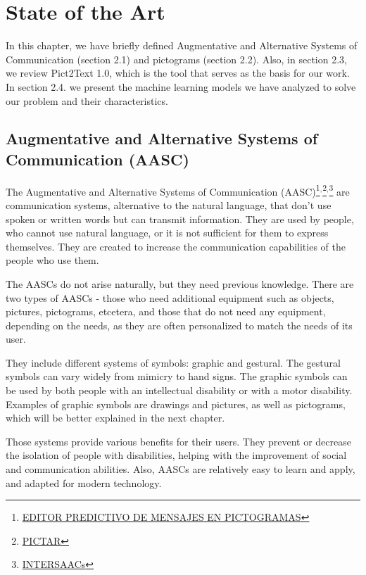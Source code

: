 
\chapter{State of the Art}
\label{State of the Art}

In this chapter, we have briefly defined Augmentative and Alternative Systems of Communication (section 2.1) and pictograms (section 2.2). Also, in section 2.3, we review Pict2Text 1.0, which is the tool that serves as the basis for our work.
In section 2.4. we present the machine learning models we have analyzed to solve our problem and their characteristics.


\section{Augmentative and Alternative Systems of Communication (AASC)}
The Augmentative and Alternative Systems of Communication (AASC)\footnote{\href{https://eprints.ucm.es/30164/1/Editor\%20predictivo\%20de\%20mensajes\%20en\%20pictogramas.pdf}{EDITOR PREDICTIVO DE MENSAJES EN PICTOGRAMAS}}$^{,}$\footnote{\href{https://eprints.ucm.es/48796/1/PICTAR.pdf}{PICTAR}}$^{,}$\footnote{\href{https://eprints.ucm.es/29245/1/ProyectoM\%C3\%A1ster_EspecialidadSistemasInteligentes_INTERSAACs_EvaGil.pdf}{INTERSAACs}} are communication systems, alternative to the natural language, that don't use spoken or written words but can transmit information. They are used by people, who cannot use natural language, or it is not sufficient for them to express themselves. They are created to increase the communication capabilities of the people who use them.

The AASCs do not arise naturally, but they need previous knowledge. There are two types of AASCs - those who need additional equipment such as objects, pictures, pictograms, etcetera, and those that do not need any equipment, depending on the needs, as they are often personalized to match the needs of its user. 

They include different systems of symbols: graphic and gestural. The gestural symbols can vary widely from mimicry to hand signs. The graphic symbols can be used by both people with an intellectual disability or with a motor disability. Examples of graphic symbols are drawings and pictures, as well as pictograms, which will be better explained in the next chapter.

Those systems provide various benefits for their users. They prevent or decrease the isolation of people with disabilities, helping with the improvement of social and communication abilities. Also, AASCs are relatively easy to learn and apply, and adapted for modern technology. 

